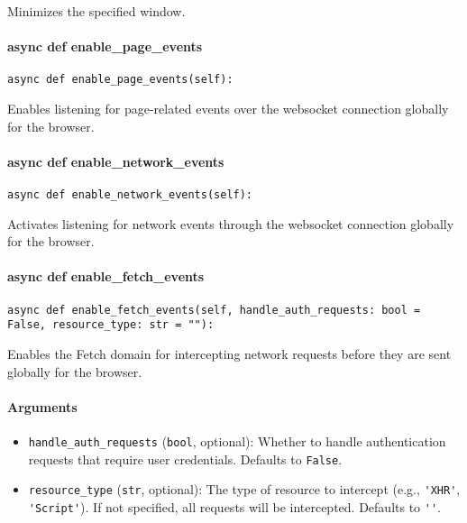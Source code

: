 \documentclass{article}
\begin{document}
\noindent Minimizes the specified window.

\paragraph{async def enable\_page\_events}

\begin{lstlisting}[style=pythonstyle]
async def enable_page_events(self):
\end{lstlisting}

\noindent Enables listening for page-related events over the websocket connection globally for the browser.

\paragraph{async def enable\_network\_events}

\begin{lstlisting}[style=pythonstyle]
async def enable_network_events(self):
\end{lstlisting}

\noindent Activates listening for network events through the websocket connection globally for the browser.

\paragraph{async def enable\_fetch\_events}

\begin{lstlisting}[style=pythonstyle]
async def enable_fetch_events(self, handle_auth_requests: bool = False, resource_type: str = ""):
\end{lstlisting}

\noindent Enables the Fetch domain for intercepting network requests before they are sent globally for the browser.

\paragraph{Arguments}

\begin{itemize}
    \item \lstinline[style=pythonstyle]|handle_auth_requests| (\lstinline[style=pythonstyle]|bool|, optional): Whether to handle authentication requests that require user credentials. Defaults to \lstinline[style=pythonstyle]|False|.
    \item \lstinline[style=pythonstyle]|resource_type| (\lstinline[style=pythonstyle]|str|, optional): The type of resource to intercept (e.g., \lstinline[style=pythonstyle]|'XHR'|, \lstinline[style=pythonstyle]|'Script'|). If not specified, all requests will be intercepted. Defaults to \lstinline[style=pythonstyle]|''|.
\end{itemize}
\end{document}
